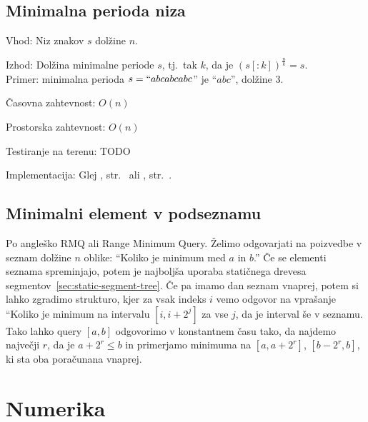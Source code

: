 \documentclass[a4paper,oneside,12pt]{article}
\newenvironment{description*}%
{
\begin{description}
\setlength{\itemsep}{0pt}
\setlength{\parskip}{2pt}
}
{\end{description}}
\newcommand{\lslice}[2]{\ensuremath{#1[:\! #2]}}
\begin{document}
\subsection{Minimalna perioda niza}
\label{sec:minperiod}
\begin{description*}
  \item[Vhod:] Niz znakov $s$ dolžine $n$.
  \item[Izhod:] Dolžina minimalne periode $s$, tj.~tak $k$, da je
  $(\lslice{s}{k})^{\frac{n}{k}} = s$. \\ Primer: minimalna perioda $s =
  ``abcabcabc$'' je ``$abc$'', dolžine 3.
  \item[Časovna zahtevnost:] $O(n)$
  \item[Prostorska zahtevnost:] $O(n)$
  \item[Testiranje na terenu:] TODO
  \item[Implementacija:] Glej , str.~\pageref{sec:zf} ali
    , str.~\pageref{sec:kmp}.
\end{description*}

\subsection{Minimalni element v podseznamu}
Po angleško RMQ ali Range Minimum Query. Želimo odgovarjati na poizvedbe v
seznam dolžine $n$ oblike: ``Koliko je minimum med $a$ in $b$.''
Če se elementi seznama spreminjajo, potem je najboljša uporaba statičnega
drevesa segmentov~\ref{sec:static-segment-tree}. Če pa imamo dan seznam vnaprej,
potem si lahko zgradimo strukturo, kjer za vsak indeks $i$ vemo odgovor na
vprašanje ``Koliko je minimum na intervalu $[i, i+2^j]$ za vse $j$, da je
interval še v seznamu. Tako lahko query $[a, b]$ odgovorimo v konstantnem času
tako, da najdemo največji $r$, da je $a+2^r \leq b$ in primerjamo minimuma na
$[a, a+2^r]$, $[b-2^r, b]$, ki sta oba poračunana vnaprej.

\section{Numerika}
\label{sec:numerika}
\end{document}
